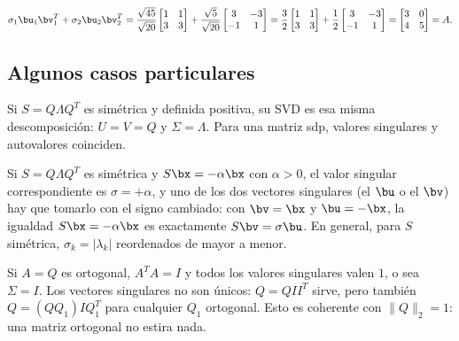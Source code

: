 \begin{example}
\[
\sigma_1\bu_1\bv_1^T+\sigma_2\bu_2\bv_2^T
=\frac{\sqrt{45}}{\sqrt{20}}\begin{bmatrix}1&1\\ 3&3\end{bmatrix}
+\frac{\sqrt{5}}{\sqrt{20}}\begin{bmatrix}3&-3\\ -1&1\end{bmatrix}
=\frac32\begin{bmatrix}1&1\\ 3&3\end{bmatrix}
+\frac12\begin{bmatrix}3&-3\\ -1&1\end{bmatrix}
=\begin{bmatrix}3&0\\ 4&5\end{bmatrix}=A .
\]
\end{example}

\subsection{Algunos casos particulares}

\begin{example}
Si $S=Q\Lambda Q^T$ es simétrica y definida positiva, su SVD es esa misma
descomposición: $U=V=Q$ y $\Sigma=\Lambda$. Para una matriz sdp, valores
singulares y autovalores coinciden.
\end{example}

\begin{example}
Si $S=Q\Lambda Q^T$ es simétrica y $S\bx=-\alpha\bx$ con $\alpha>0$, el valor
singular correspondiente es $\sigma=+\alpha$, y uno de los dos vectores
singulares (el $\bu$ o el $\bv$) hay que tomarlo con el signo cambiado: con
$\bv=\bx$ y $\bu=-\bx$, la igualdad $S\bx=-\alpha\bx$ es exactamente
$S\bv=\sigma\bu$. En general, para $S$ simétrica,
$\sigma_k=|\lambda_k|$ reordenados de mayor a menor.
\end{example}

\begin{example}
Si $A=Q$ es ortogonal, $A^TA=I$ y todos los valores singulares valen $1$,
o sea $\Sigma=I$. Los vectores singulares no son únicos: $Q=QII^T$ sirve,
pero también $Q=(QQ_1)IQ_1^T$ para cualquier $Q_1$ ortogonal. Esto es
coherente con $\|Q\|_2=1$: una matriz ortogonal no estira nada.
\end{example}

